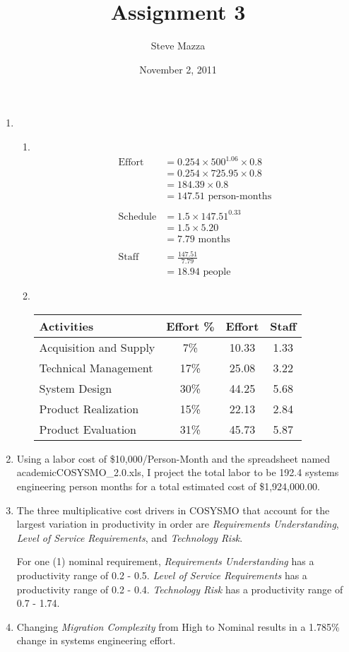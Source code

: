\documentclass[letterpaper,10pt]{article}
\title{Assignment 3}
\author{Steve Mazza}
\date{November 2, 2011}
\begin{document}
\maketitle

\begin{enumerate}
	\item
	\begin{enumerate}
		\item\ 
			\begin{align*}
			\mbox{Effort} &= 0.254\times 500^{1.06}\times 0.8 \\
			&= 0.254\times 725.95\times 0.8 \\
			&= 184.39\times 0.8 \\
			&= 147.51 \mbox{ person-months} \\ \\
			\mbox{Schedule} &= 1.5\times 147.51^{0.33} \\
			&= 1.5\times 5.20 \\
			&= 7.79\mbox{ months} \\ \\
			\mbox{Staff} &= \frac{147.51}{7.79} \\
			&= 18.94\mbox{ people}
			\end{align*}
		\item\ 
			\begin{table}[htdp]
				\begin{center}
					\begin{tabular}{lccc}
						\textbf{Activities} & \textbf{Effort \%} & \textbf{Effort} & \textbf{Staff} \\
						\hline
						Acquisition and Supply & 7\% & 10.33 & 1.33 \\
						Technical Management & 17\% & 25.08 & 3.22 \\
						System Design & 30\% & 44.25 & 5.68 \\
						Product Realization & 15\% & 22.13 & 2.84 \\
						Product Evaluation & 31\% & 45.73 & 5.87 \\
						\hline
					\end{tabular}
				\end{center}
			\end{table}
	\end{enumerate}
	\item Using a labor cost of \$10,000/Person-Month and the spreadsheet named academicCOSYSMO\_2.0.xls,  I project the total labor to be 192.4 systems engineering person months for a total estimated cost of \$1,924,000.00.
	\item The three multiplicative cost drivers in COSYSMO that account for the largest variation in productivity in order are \emph{Requirements Understanding}, \emph{Level of Service Requirements}, and \emph{Technology Risk}.
	\par For one (1) nominal requirement, \emph{Requirements Understanding} has a productivity range of 0.2 - 0.5.  \emph{Level of Service Requirements} has a productivity range of 0.2 - 0.4.  \emph{Technology Risk} has a productivity range of 0.7 - 1.74.
	\item Changing \emph{Migration Complexity} from High to Nominal results in a 1.785\% change in systems engineering effort.
\end {enumerate}
\end{document}
